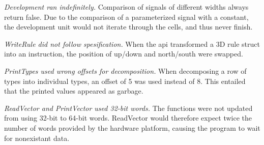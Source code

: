 \emph{Development ran indefinitely.}
Comparison of signals of different widths always return false.
Due to the comparison of a parameterized signal with a constant, the development unit would not iterate through the cells, and thus never finish.

\emph{WriteRule did not follow spesification.}
When the api transformed a 3D rule struct into an instruction, the position of up/down and north/south were swapped.

\emph{PrintTypes used wrong offsets for decomposition.}
When decomposing a row of types into individual types, an offset of 5 was used instead of 8.
This entailed that the printed values appeared as garbage.

\emph{ReadVector and PrintVector used 32-bit words.}
The functions were not updated from using 32-bit to 64-bit words.
ReadVector would therefore expect twice the number of words provided by the hardware platform, causing the program to wait for nonexistant data.

